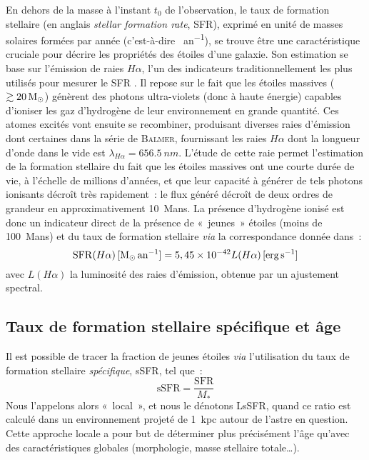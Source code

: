 \documentclass[../main/main.tex]{subfiles}
\begin{document}
En dehors de la masse à l'instant $t_0$ de l'observation, le taux de formation
stellaire (en anglais \textit{stellar formation rate}, SFR), exprimé en unité de
masses solaires formées par année (c'est-à-dire \si{\Msun.an^{-1}}), se trouve
être une caractéristique cruciale pour décrire les propriétés des étoiles d'une
galaxie. Son estimation se base sur l'émission de raies $H\alpha$, l'un des
indicateurs traditionnellement les plus utilisés pour mesurer le SFR
\citep{kennicutt1998}. Il repose sur le fait que les étoiles massives ($\gtrsim
\SI{20}{\Msun}$) génèrent des photons ultra-violets (donc à haute énergie)
capables d'ioniser les gaz d'hydrogène de leur environnement
\citep{calzetti2013} en grande quantité. Ces atomes excités vont ensuite se
recombiner, produisant diverses raies d'émission dont certaines dans la série de
\textsc{Balmer}, fournissant les raies $H\alpha$ dont la longueur d'onde dans le
vide est $\lambda_{H\alpha} = \SI{656.5}{nm}$. L'étude de cette raie permet
l'estimation de la formation stellaire du fait que les étoiles massives ont une
courte durée de vie, à l'échelle de millions d'années, et que leur capacité à
générer de tels photons ionisants décroît très rapidement~: le flux généré
décroît de deux ordres de grandeur en approximativement \SI{10}{Mans}. La
présence d'hydrogène ionisé est donc un indicateur direct de la présence de
«~jeunes~» étoiles (moins de \SI{100}{Mans}) et du taux de formation stellaire
\textit{via} la correspondance donnée dans~\cite{calzetti2013}:
\begin{equation}\label{eq:sfrha}
    \mathrm{SFR}(H\alpha)\,[\si{\Msun.an^{-1}}] =
    5,45\times 10^{-42}L(H\a)\,[\si{erg.s^{-1}}]
\end{equation}
avec $L(H\alpha)$ la luminosité des raies d'émission, obtenue par un ajustement
spectral.

\subsection{Taux de formation stellaire spécifique et âge}\label{ssec:lssfr}

Il est possible de tracer la fraction de jeunes étoiles \textit{via}
l'utilisation du taux de formation stellaire \textit{spécifique}, sSFR, tel
que~:
\begin{equation}\label{eq:ssfr}
    \mathrm{sSFR} = \frac{\mathrm{SFR}}{M_*}
\end{equation}
Nous l'appelons alors «~local~», et nous le dénotons LsSFR, quand ce ratio est
calculé dans un environnement projeté de \SI{1}{kpc} autour de l'astre en
question. Cette approche locale a pour but de déterminer plus précisément l'âge
qu'avec des caractéristiques globales (morphologie, masse stellaire totale…).
\end{document}
